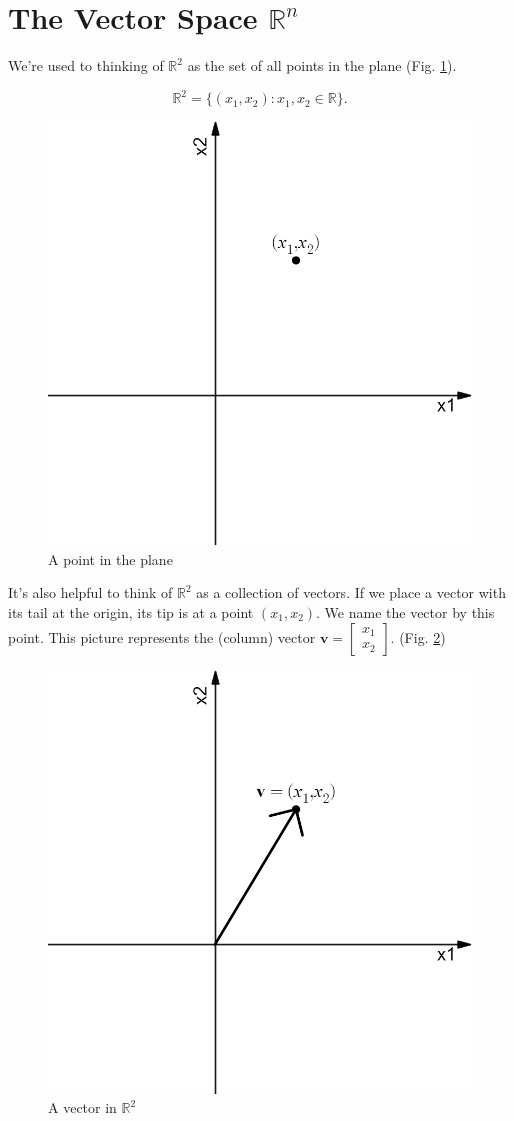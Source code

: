 \documentclass[
]{book}
\theoremstyle{definition}
\theoremstyle{definition}
\theoremstyle{definition}
\theoremstyle{definition}
\theoremstyle{remark}
\begin{document}
\section{\texorpdfstring{The Vector Space \(\mathbb{R}^n\)}{The Vector Space \textbackslash mathbb\{R\}\^{}n}}\label{artoo}

We're used to thinking of \(\mathbb{R}^2\) as the set of all points in the plane (Fig. \ref{fig:ptinr2}).

\[\mathbb{R}^2=\{(x_1,x_2): x_1,x_2\in \mathbb{R}\}.\]

\begin{figure}

{\centering \includegraphics[width=0.5\linewidth]{images/vg0} 

}

\caption{A point in the plane}\label{fig:ptinr2}
\end{figure}

It's also helpful to think of \(\mathbb{R}^2\) as a collection of vectors. If we place a vector with its tail at the origin, its tip is at a point \((x_1,x_2)\). We name the vector by this point. This picture represents the (column) vector
\(\mathbf{v}=\begin{bmatrix}x_1\\x_2 \end{bmatrix}\). (Fig. \ref{fig:vecinr2})

\begin{figure}

{\centering \includegraphics[width=0.5\linewidth]{images/vg1} 

}

\caption{A vector in $\mathbb{R}^2$}\label{fig:vecinr2}
\end{figure}
\end{document}
